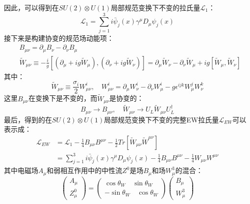因此，可以得到在$SU(2) \otimes U(1)$局部规范变换下不变的拉氏量$\mathcal{L}_1$：
\begin{equation} 
\label{eq:EW10}
\mathcal{L}_1= \sum_{j=1}^3 i\bar{\psi}_j(x)\gamma^{\mu}D_{\mu}\psi_j(x)
\end{equation}
接下来是构建协变的规范场动能项：
\begin{equation} 
\label{eq:EW11}
 \begin{split}
 & B_{\mu\nu}= \partial_{\mu}B_{\nu}- \partial_{\nu}B_{\mu}
  \\
 & \widetilde{W}_{\mu\nu} \equiv -\frac{i}{g} \left[ \left(  \partial_{\mu}+ig\widetilde{W}_{\mu} \right) ,  \left(  \partial_{\nu}+ig\widetilde{W}_{\nu}  \right)    \right]
  =\partial_{\mu}\widetilde{W}_{\nu}- \partial_{\nu}\widetilde{W}_{\mu}+ ig \left[  \widetilde{W}_{\mu}  ,\widetilde{W}_{\nu}   \right]
 \end{split}
\end{equation}
其中：
\begin{equation} 
\label{eq:EW12}
\widetilde{W}_{\mu\nu} \equiv \frac{\sigma_i}{2} W^i_{\mu\nu}, \quad 
W^i_{\mu\nu}= \partial_{\mu}W^i_{\nu}- \partial_{\nu}W^i_{\mu}- g\epsilon^{ijk}W^j_{\mu}W^k_{\nu}
\end{equation}
这里$B_{\mu\nu}$在变换下是不变的，而$\widetilde{W}_{\mu\nu}$是协变的：
\begin{equation} 
\label{eq:EW13}
B_{\mu\nu} \rightarrow B_{\mu\nu}, \quad \widetilde{W}_{\mu\nu}  \rightarrow   U_L \widetilde{W}_{\mu\nu} U^{\dagger}_L
\end{equation}
最后，得到的在$SU(2) \otimes U(1)$局部规范变换下不变的完整EW拉氏量$\mathcal{L}_{EW}$可以表示成：
\begin{equation} 
\label{eq:EW14}
 \begin{split}
  \mathcal{L}_{EW}&= \mathcal{L}_1 - \frac{1}{4}B_{\mu\nu}B^{\mu\nu}-\frac{1}{2}Tr\left[ \widetilde{W}_{\mu\nu}\widetilde{W}^{\mu\nu} \right]
  \\
 & =\sum_{j=1}^3 i\bar{\psi}_j(x)\gamma^{\mu}D_{\mu}\psi_j(x) - \frac{1}{4}B_{\mu\nu}B^{\mu\nu}-\frac{1}{4}W_{\mu\nu}W^{\mu\nu}
 \end{split}
\end{equation}
其中电磁场$A_{\mu}$和弱相互作用中的中性流$Z^0$是场$B_{\mu}$和场$W^3_{\mu}$的混合：
\begin{equation} 
\label{eq:EW15}
 \left( \begin{array}{l} A_{\mu}  \\  Z^0_{\mu} \end{array} \right) = 
 \left( \begin{array}{l}  \cos \theta_W \quad \sin \theta_W \\  - \sin \theta_W  \quad \cos \theta_W \end{array} \right) 
 \left( \begin{array}{l}  B_{\mu} \\  W^3_{\mu} \end{array} \right) 
\end{equation}

